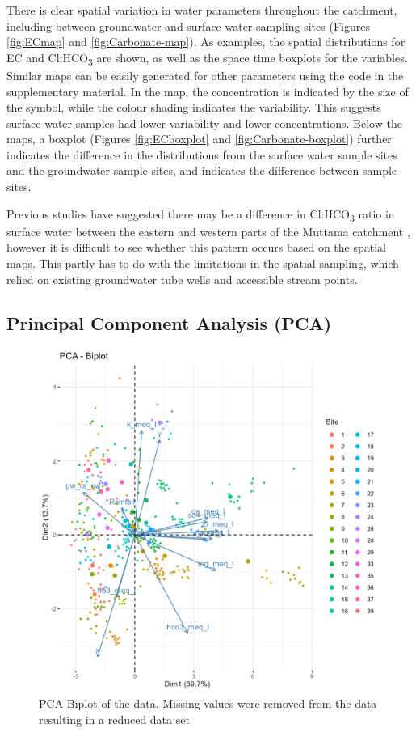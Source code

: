 \documentclass[, manuscript]{copernicus}
\begin{document}
There is clear spatial variation in water parameters throughout the
catchment, including between groundwater and surface water sampling
sites (Figures \ref{fig:ECmap} and \ref{fig:Carbonate-map}). As
examples, the spatial distributions for EC and Cl:HCO\textsubscript{3}
are shown, as well as the space time boxplots for the variables. Similar
maps can be easily generated for other parameters using the code in the
supplementary material. In the map, the concentration is indicated by
the size of the symbol, while the colour shading indicates the
variability. This suggests surface water samples had lower variability
and lower concentrations. Below the maps, a boxplot (Figures
\ref{fig:ECboxplot} and \ref{fig:Carbonate-boxplot}) further indicates
the difference in the distributions from the surface water sample sites
and the groundwater sample sites, and indicates the difference between
sample sites.

Previous studies have suggested there may be a difference in
Cl:HCO\textsubscript{3} ratio in surface water between the eastern and
western parts of the Muttama catchment \citep{Conyers2008}, however it
is difficult to see whether this pattern occurs based on the spatial
maps. This partly has to do with the limitations in the spatial
sampling, which relied on existing groundwater tube wells and accessible
stream points.

\subsection{Principal Component Analysis (PCA)}

\clearpage
\begin{figure}
\includegraphics[width=0.9\linewidth]{Figures/pca_biplot} \caption{PCA Biplot of the data. Missing values were removed from the data resulting in a reduced data set}\label{fig:PCA-plot}
\end{figure}
\end{document}
